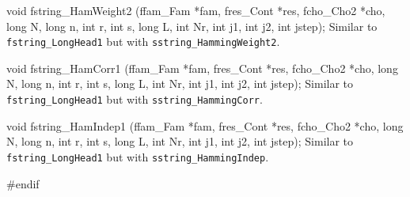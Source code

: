 void fstring_HamWeight2 (ffam_Fam *fam, fres_Cont *res, fcho_Cho2 *cho,
                         long N, long n, int r, int s, long L,
                         int Nr, int j1, int j2, int jstep);
\endcode
  \tab Similar to {\tt fstring\_LongHead1} but with
 {\tt sstring\_HammingWeight2}.
 \endtab
\code


void fstring_HamCorr1 (ffam_Fam *fam, fres_Cont *res, fcho_Cho2 *cho,
                       long N, long n, int r, int s, long L,
                       int Nr, int j1, int j2, int jstep);
\endcode
  \tab Similar to {\tt fstring\_LongHead1} but with
 {\tt sstring\_HammingCorr}.
 \endtab
\code


void fstring_HamIndep1 (ffam_Fam *fam, fres_Cont *res, fcho_Cho2 *cho,
                        long N, long n, int r, int s, long L,
                        int Nr, int j1, int j2, int jstep);
\endcode
  \tab Similar to {\tt fstring\_LongHead1} but with
 {\tt sstring\_HammingIndep}.
 \endtab
\code

\hide
#endif
\endhide
\endcode

